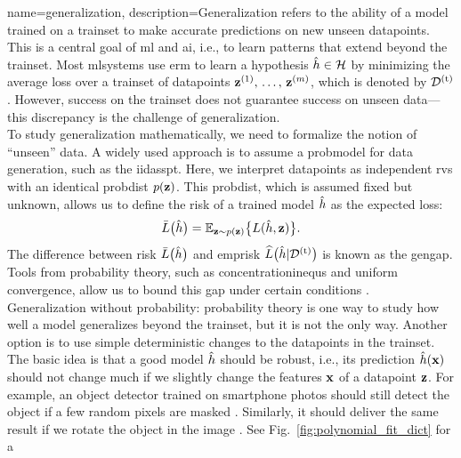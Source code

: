 {name={generalization},
	description={Generalization refers to the ability of a \gls{model} trained on a \gls{trainset} to make accurate 
		\glspl{prediction} on new unseen \glspl{datapoint}. This is a central goal of \gls{ml} and \gls{ai}, i.e., 
		to learn patterns that extend beyond the \gls{trainset}. Most \glspl{mlsystem}  
		use \gls{erm} to learn a \gls{hypothesis} $\hat{h} \in \mathcal{H}$ by minimizing 
		the average \gls{loss} over a \gls{trainset} of \glspl{datapoint} ${\bf z}^{(1)}, \,\ldots, \,{\bf z}^{(m)}$, 
		which is denoted by $\mathcal{D}^{(\rm t)}$. However, success on the \gls{trainset} does not guarantee success on 
		unseen \gls{data}—this discrepancy is the challenge of generalization. \\ To study generalization 
		mathematically, we need to formalize the notion of ``unseen'' \gls{data}. A widely used 
		approach is to assume a \gls{probmodel} for \gls{data} generation, such as the \gls{iidasspt}. 
		Here, we interpret \glspl{datapoint} as independent \glspl{rv} with an identical 
		\gls{probdist} $p({\bf z})$. This \gls{probdist}, which is assumed fixed but unknown, 
		allows us to define the \gls{risk} of a trained \gls{model} $\hat{h}$ as the expected \gls{loss}:
		\[
		\bar{L} \big( \hat{h} \big)=\mathbb{E}_{{\bf z} \sim p({\bf z})} \big\{ L(\hat{h}, {\bf z}) \big\}.
		\]
		The difference between \gls{risk} $\bar{L} \big( \hat{h} \big)$ and \gls{emprisk} $\widehat{L}\big(\hat{h}|\mathcal{D}^{(\rm t)}\big)$ 
		is known as the \gls{gengap}. Tools from \gls{probability} theory, such as \glspl{concentrationinequ} 
		and uniform \gls{convergence}, allow us to bound this gap under certain conditions \cite{ShalevMLBook}.\\
		Generalization without \gls{probability}: \Gls{probability} theory is one way to study how well a 
		\gls{model} generalizes beyond the \gls{trainset}, but it is not the only way. Another option is to use 
		simple deterministic changes to the \glspl{datapoint} in the \gls{trainset}. The basic idea is that a 
		good \gls{model} $\hat{h}$ should be robust, i.e., its \gls{prediction} $\hat{h}({\bf x})$ 
		should not change much if we slightly change the \glspl{feature} ${\bf x}$ of a \gls{datapoint} ${\bf z}$. 
		For example, an object detector trained on smartphone photos should still detect the object if a few 
		random pixels are masked \cite{OnePixelAttack}. Similarly, it should deliver the same result if we rotate 
		the object in the image \cite{MallatUnderstandingDeepLearning}. See Fig.\ \ref{fig:polynomial_fit_dict} for a 
}}
